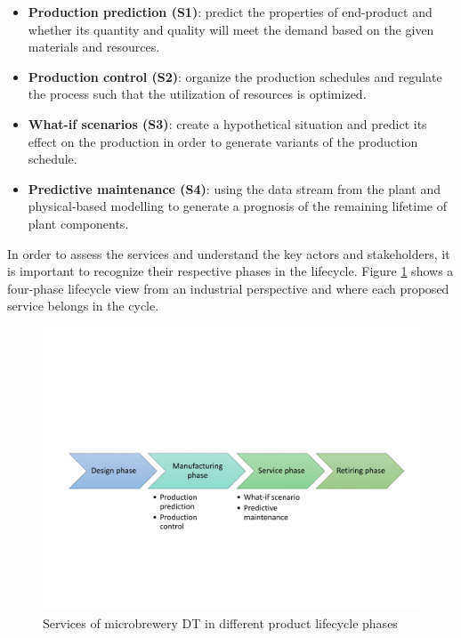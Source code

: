 \documentclass[journal,onecolumn]{IEEEtran} %
\begin{document}
\begin{itemize}
  \item \textbf{Production prediction (S1)}: predict the properties of end-product and whether its quantity and quality will meet the demand based on the given materials and resources. 

  \item \textbf{Production control (S2)}: organize the production schedules and regulate the process such that the utilization of resources is optimized.

  \item \textbf{What-if scenarios (S3)}: create a hypothetical situation and predict its effect on the production in order to generate variants of the production schedule.
  
  \item \textbf{Predictive maintenance (S4)}: using the data stream from the plant and physical-based modelling to generate a prognosis of the remaining lifetime of plant components.
  
\end{itemize}

In order to assess the services and understand the key actors and stakeholders, it is important to recognize their respective phases in the lifecycle. Figure \ref{fig:lifecycle} shows a four-phase lifecycle view \cite{Liu2021} from an industrial perspective and where each proposed service belongs in the cycle.
 
 \begin{figure}[hbt!]
  \centering
  \includegraphics[scale=0.5]{figures/lifecycle.pdf}
  \caption{Services of microbrewery DT in different product lifecycle phases}
  \label{fig:lifecycle}
\end{figure}
\end{document}
